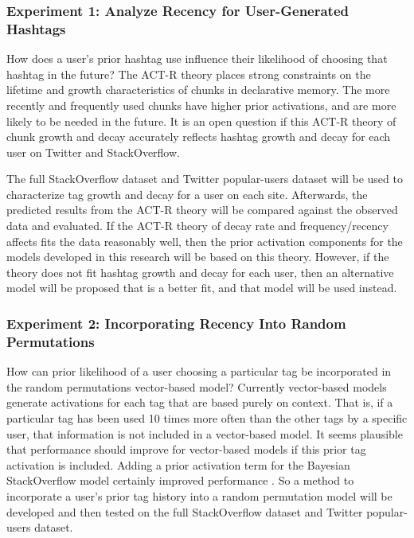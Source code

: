 \documentclass[man,floatsintext]{apa6}
\begin{document}
\subsubsection{Experiment 1: Analyze Recency for User-Generated Hashtags}

How does a user's prior hashtag use influence their likelihood of choosing that hashtag in the future?
The ACT-R theory places strong constraints on the lifetime and growth characteristics of chunks in declarative memory.
The more recently and frequently used chunks have higher prior activations, and are more likely to be needed in the future.
It is an open question if this ACT-R theory of chunk growth and decay accurately reflects hashtag growth and decay for each user on Twitter and StackOverflow.

The full StackOverflow dataset and Twitter popular-users dataset will be used to characterize tag growth and decay for a user on each site.
Afterwards, the predicted results from the ACT-R theory will be compared against the observed data and evaluated.
If the ACT-R theory of decay rate and frequency/recency affects fits the data reasonably well, then the prior activation components for the models developed in this research will be based on this theory.
However, if the theory does not fit hashtag growth and decay for each user, then an alternative model will be proposed that is a better fit, and that model will be used instead.

\subsubsection{Experiment 2: Incorporating Recency Into Random Permutations}

How can prior likelihood of a user choosing a particular tag be incorporated in the random permutations vector-based model?
Currently vector-based models generate activations for each tag that are based purely on context.
That is, if a particular tag has been used 10 times more often than the other tags by a specific user, that information is not included in a vector-based model.
It seems plausible that performance should improve for vector-based models if this prior tag activation is included.
Adding a prior activation term for the Bayesian StackOverflow model certainly improved performance \parencite{Stanley2013}.
So a method to incorporate a user's prior tag history into a random permutation model will be developed and then tested on the full StackOverflow dataset and Twitter popular-users dataset.
\end{document}
